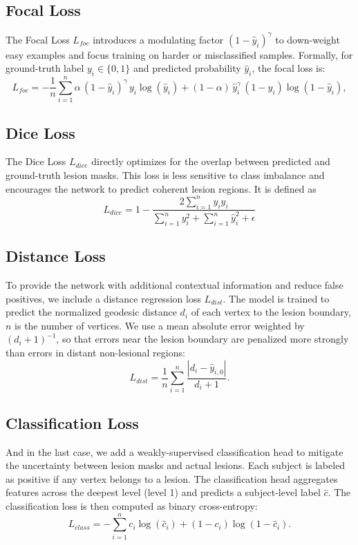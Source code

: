 \documentclass[FCD_GNN.tex]{subfiles}
\begin{document}
\subsection{Focal Loss}
The Focal Loss $L_{foc}$ introduces a modulating factor $(1-\hat{y}_i)^\gamma$ to down-weight easy examples and focus training on harder or misclassified samples. Formally, for ground-truth label $y_i \in \{0,1\}$ and predicted probability $\hat{y}_i$, the focal loss is:
\[
L_{foc} = - \frac{1}{n} \sum_{i=1}^{n} \alpha \, (1-\hat{y}_i)^\gamma \, y_i \log(\hat{y}_i) + (1-\alpha) \, \hat{y}_i^\gamma \, (1-y_i) \log(1-\hat{y}_i),
\]

\subsection{Dice Loss}
The Dice Loss $L_{dice}$ directly optimizes for the overlap between predicted and ground-truth lesion masks. This loss is less sensitive to class imbalance and encourages the network to predict coherent lesion regions. It is defined as
\[
L_{dice} = 1 - \frac{2 \sum_{i=1}^n y_i \hat{y}_i}{\sum_{i=1}^n y_i^2 + \sum_{i=1}^n \hat{y}_i^2 + \epsilon}
\]

\subsection{Distance Loss}
To provide the network with additional contextual information and reduce false positives, we include a distance regression loss $L_{dist}$. The model is trained to predict the normalized geodesic distance $d_i$ of each vertex to the lesion boundary, $n$ is the number of vertices. We use a mean absolute error weighted by $(d_i+1)^{-1}$, so that errors near the lesion boundary are penalized more strongly than errors in distant non-lesional regions:
\[
L_{dist} = \frac{1}{n} \sum_{i=1}^{n} \frac{|d_i - \hat{y}_{i,0}|}{d_i + 1}.
\]

\subsection{Classification Loss}
And in the last case, we add a weakly-supervised classification head to mitigate the uncertainty between lesion masks and actual lesions. Each subject is labeled as positive if any vertex belongs to a lesion. The classification head aggregates features across the deepest level (level 1) and predicts a subject-level label $\hat{c}$. The classification loss is then computed as binary cross-entropy:
\[
L_{class} = - \sum_{i=1}^{n} c_i \log(\hat{c}_i) + (1-c_i)\log(1-\hat{c}_i).
\]
\end{document}
